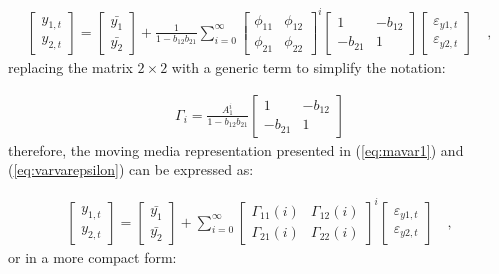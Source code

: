 \begin{align*}
    \begin{bmatrix}
    y_{1,t} \\
    y_{2,t}
    \end{bmatrix} =
    \begin{bmatrix}
    \bar{y_1}\\
    \bar{y_2}
    \end{bmatrix} + \frac{1}{1 - b_{12}b_{21}} \sum_{i=0}^{\infty}
    \begin{bmatrix}
    \phi_{11} & \phi_{12} \\
    \phi_{21} & \phi_{22}
    \end{bmatrix}^i
    \begin{bmatrix}
    1 & -b_{12} \\
    -b_{21} & 1
    \end{bmatrix}
    \begin{bmatrix}
    \varepsilon_{y1, t} \\
    \varepsilon_{y2, t}
    \end{bmatrix} \quad ,
\end{align*}
replacing the matrix $2 \times 2$ with a generic term to simplify the notation:

\begin{align}
    \Gamma_i = \frac{A_1 ^i}{1 - b_{12}b_{21}}\begin{bmatrix}
    1 & -b_{12}\\
    -b_{21} & 1
    \end{bmatrix}
\end{align}
therefore, the moving media representation presented in (\ref{eq:mavar1}) and (\ref{eq:varvarepsilon}) can be expressed as:

\begin{align} \label{eq:mavar1}
    \begin{bmatrix}
    y_{1,t} \\
    y_{2,t}
    \end{bmatrix} = 
    \begin{bmatrix}
    \bar{y_1}\\
    \bar{y_2}
    \end{bmatrix} + \sum_{i=0}^{\infty}
    \begin{bmatrix}
    \Gamma_{11}(i) & \Gamma_{12}(i) \\
    \Gamma_{21}(i) & \Gamma_{22}(i)
    \end{bmatrix}^i
    \begin{bmatrix}
    \varepsilon_{y1, t} \\
    \varepsilon_{y2, t}
    \end{bmatrix} \quad ,
\end{align}
or in a more compact form:

